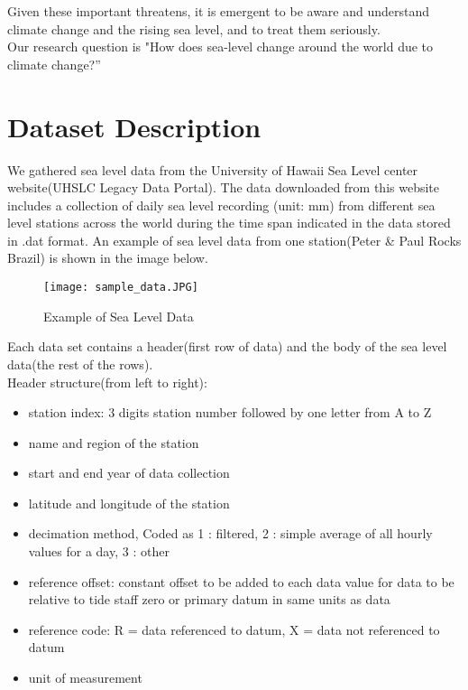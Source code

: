 \documentclass[fontsize=11pt]{article}
\begin{document}
    Given these important threatens, it is emergent to be aware and understand climate change and the rising sea level, and to treat them seriously.\\

    Our research question is "How does sea-level change around the world due to climate change?”

    \newpage
    \section*{Dataset Description}
    We gathered sea level data from the University of Hawaii Sea Level center website(UHSLC Legacy Data Portal). The data downloaded from this website includes a collection of daily sea level recording (unit: mm) from different sea level stations across the world during the time span indicated in the data stored in .dat format. An example of sea level data from one station(Peter \& Paul Rocks Brazil) is shown in the image below.

    \begin{figure}[h!]
        \centering
        \texttt{[image: sample\_data.JPG]}
        \caption{Example of Sea Level Data}
        \label{fig:sample_data.JPG}
    \end{figure}

    Each data set contains a header(first row of data) and the body of the sea level data(the rest of the rows).\\

    Header structure(from left to right):
    \begin{itemize}
        \item
        station index: 3 digits station number followed by one letter from A to Z
        \item
        name and region of the station
        \item
        start and end year of data collection
        \item
        latitude and longitude of the station
        \item
        decimation method, Coded as
        1 : filtered,
        2 : simple average of all hourly values for a day,
        3 : other
        \item
        reference offset: constant offset to be added to each data value for data to be relative to tide staff zero or primary datum in same units as data
        \item
        reference code: R = data referenced to datum,
        X = data not referenced to datum
        \item
        unit of measurement
    \end{itemize}
\end{document}

